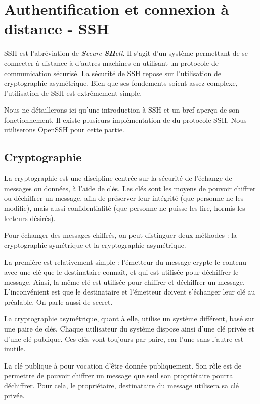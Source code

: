\section{Authentification et connexion à distance - SSH} \label{sec:ssh}

SSH est l'abréviation de \textit{\textbf{S}ecure \textbf{SH}ell}. Il s'agit d'un système permettant de se connecter à distance à d'autres machines en utilisant un protocole de communication sécurisé. La sécurité de SSH repose sur l'utilisation de cryptographie asymétrique. Bien que ses fondements soient assez complexe, l'utilisation de SSH est extrêmement simple.

Nous ne détaillerons ici qu'une introduction à SSH et un bref aperçu de son fonctionnement.
 Il existe plusieurs implémentation de du protocole SSH. Nous utiliserons \href{https://www.openssh.com/}{OpenSSH} pour cette partie.

\subsection{Cryptographie}
La cryptographie est une discipline centrée sur la sécurité de l'échange de messages ou données, à l'aide de clés. Les clés sont les moyens de pouvoir chiffrer ou déchiffrer un message, afin de préserver leur intégrité (que personne ne les modifie), mais aussi  confidentialité (que personne ne puisse les lire, hormis les lecteurs désirés).

Pour échanger des messages chiffrés, on peut distinguer deux méthodes : la cryptographie symétrique et la cryptographie asymétrique.

La première est relativement simple : l'émetteur du message crypte le contenu avec une clé que le destinataire connaît, et qui est utilisée pour déchiffrer le message. Ainsi, la même clé est utilisée pour chiffrer et déchiffrer un message. L'inconvénient est que le destinataire et l'émetteur doivent s'échanger leur clé au préalable. On parle aussi de secret.

La cryptographie asymétrique, quant à elle, utilise un système différent, basé sur une paire de clés. Chaque utilisateur du système dispose ainsi d'une clé privée et d'une clé publique. Ces clés vont toujours par paire, car l'une sans l'autre est inutile.

La clé publique à pour vocation d'être donnée publiquement. Son rôle est de permettre de pouvoir chiffrer un message que seul son propriétaire pourra déchiffrer. Pour cela, le propriétaire, destinataire du message utilisera sa clé privée.

